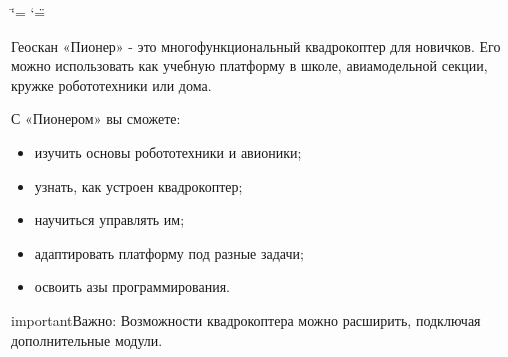 \documentclass[a4paper,10pt,russian]{sphinxmanual}
\title{}
\date{}
\author{}
\let\sphinxpxdimen\pdfpxdimen\else\newdimen\sphinxpxdimen
\begin{document}
\ifdefined\shorthandoff
  \ifnum\catcode`\=\string=\active\shorthandoff{=}\fi
  \ifnum\catcode`\"=\active{}\fi
\fi

\pagestyle{empty}
\maketitle
\pagestyle{plain}
\sphinxtableofcontents
\pagestyle{normal}
\label{\detokenize{index::doc}}



\begin{DUlineblock}{0em}
\item[] Геоскан «Пионер» - это многофункциональный квадрокоптер для новичков. Его можно использовать как учебную платформу в школе, авиамодельной секции, кружке робототехники или дома.
\end{DUlineblock}

\noindent{\hspace*{\fill}\sphinxincludegraphics[width=420\sphinxpxdimen]{{pioneer}.png}\hspace*{\fill}}

С «Пионером» вы сможете:
\begin{itemize}
\item {} 
изучить основы робототехники и авионики;

\item {} 
узнать, как устроен квадрокоптер;

\item {} 
научиться управлять им;

\item {} 
адаптировать платформу под разные задачи;

\item {} 
освоить азы программирования.

\end{itemize}

\begin{sphinxadmonition}{important}{Важно:}
Возможности квадрокоптера можно расширить, подключая дополнительные модули.
\end{sphinxadmonition}
\end{document}
